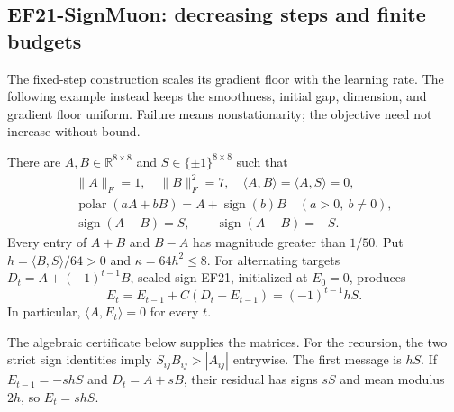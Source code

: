 \subsection{EF21-SignMuon: decreasing steps and finite budgets}
\label{add:ef_vanishing}

The fixed-step construction scales its gradient floor with the learning
rate. The following example instead keeps the smoothness, initial gap,
dimension, and gradient floor uniform. Failure means nonstationarity;
the objective need not increase without bound.

\begin{lemma}
\label{add:lem:invisible}
There are $A,B\in\mathbb R^{8\times8}$ and
$S\in\{\pm1\}^{8\times8}$ such that
\begin{gather*}
 \|A\|_F=1,\quad \|B\|_F^2=7,\quad
 \langle A,B\rangle=\langle A,S\rangle=0,\\
 \operatorname{polar}(aA+bB)=A+\operatorname{sign}(b)B
 \quad(a>0,\ b\ne0),\\
 \operatorname{sign}(A+B)=S,\qquad
 \operatorname{sign}(A-B)=-S.
\end{gather*}
Every entry of $A+B$ and $B-A$ has magnitude greater than $1/50$.
Put $h=\langle B,S\rangle/64>0$ and $\kappa=64h^2\le8$.
For alternating targets $D_t=A+(-1)^{t-1}B$, scaled-sign EF21,
initialized at $E_0=0$, produces
\[
 E_t=E_{t-1}+C(D_t-E_{t-1})=(-1)^{t-1}hS.
\]
In particular, $\langle A,E_t\rangle=0$ for every $t$.
\end{lemma}

The algebraic certificate below supplies the matrices. For the recursion,
the two strict sign identities imply
$S_{ij}B_{ij}>|A_{ij}|$ entrywise. The first message is $hS$.
If $E_{t-1}=-shS$ and $D_t=A+sB$, their residual has signs $sS$
and mean modulus $2h$, so $E_t=shS$.


